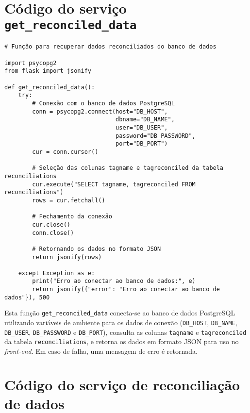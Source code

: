 \chapter{Código do serviço \texttt{get\_reconciled\_data}}
\label{Anexo:CodigoFunctionGetReconciledData}

\begin{verbatim}
# Função para recuperar dados reconciliados do banco de dados

import psycopg2
from flask import jsonify

def get_reconciled_data():
    try:
        # Conexão com o banco de dados PostgreSQL
        conn = psycopg2.connect(host="DB_HOST", 
                                dbname="DB_NAME", 
                                user="DB_USER", 
                                password="DB_PASSWORD",
                                port="DB_PORT")
        cur = conn.cursor()

        # Seleção das colunas tagname e tagreconciled da tabela reconciliations
        cur.execute("SELECT tagname, tagreconciled FROM reconciliations")
        rows = cur.fetchall()

        # Fechamento da conexão
        cur.close()
        conn.close()

        # Retornando os dados no formato JSON
        return jsonify(rows)
    
    except Exception as e:
        print("Erro ao conectar ao banco de dados:", e)
        return jsonify({"error": "Erro ao conectar ao banco de dados"}), 500
\end{verbatim}

Esta função \texttt{get\_reconciled\_data} conecta-se ao banco de dados PostgreSQL utilizando variáveis de ambiente para os dados de conexão (\texttt{DB\_HOST}, \texttt{DB\_NAME}, \texttt{DB\_USER}, \texttt{DB\_PASSWORD} e \texttt{DB\_PORT}), consulta as colunas \texttt{tagname} e \texttt{tagreconciled} da tabela \texttt{reconciliations}, e retorna os dados em formato JSON para uso no \textit{front-end}. Em caso de falha, uma mensagem de erro é retornada.

\chapter{Código do serviço de reconciliação de dados}
\label{Anexo:CodigoReconciliacaoDados}

